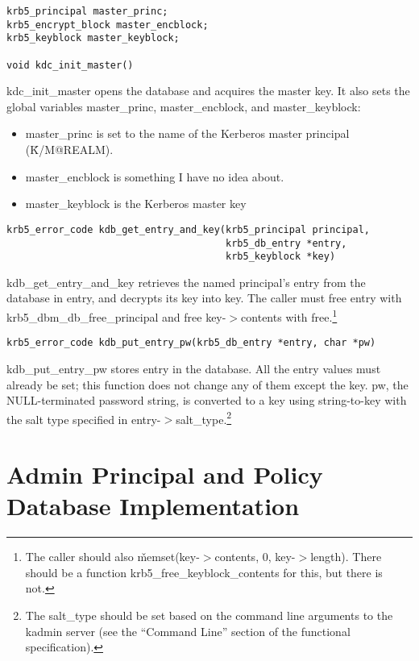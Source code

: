 \begin{verbatim}
krb5_principal master_princ;
krb5_encrypt_block master_encblock;
krb5_keyblock master_keyblock;

void kdc_init_master()
\end{verbatim}

kdc_init_master opens the database and acquires the master key.  It
also sets the global variables master_princ, master_encblock, and
master_keyblock:

\begin{itemize}
\item master_princ is set to the name of the Kerberos master principal
(\v{K/M@REALM}).

\item master_encblock is something I have no idea about.

\item master_keyblock is the Kerberos master key
\end{itemize}

\begin{verbatim}
krb5_error_code kdb_get_entry_and_key(krb5_principal principal,
                                      krb5_db_entry *entry,
                                      krb5_keyblock *key)
\end{verbatim}

kdb_get_entry_and_key retrieves the named principal's entry from the
database in entry, and decrypts its key into key.  The caller must
free entry with krb5_dbm_db_free_principal and free key-$>$contents with
free.\footnote{The caller should also \v{memset(key-$>$contents, 0,
key-$>$length)}.  There should be a function krb5_free_keyblock_contents
for this, but there is not.}

\begin{verbatim}
krb5_error_code kdb_put_entry_pw(krb5_db_entry *entry, char *pw)
\end{verbatim}

kdb_put_entry_pw stores entry in the database.  All the entry values
must already be set; this function does not change any of them except
the key.  pw, the NULL-terminated password string, is converted to a
key using string-to-key with the salt type specified in
entry-$>$salt_type.\footnote{The salt_type should be set based on the
command line arguments to the kadmin server (see the ``Command Line''
section of the functional specification).}

\section{Admin Principal and Policy Database Implementation}

